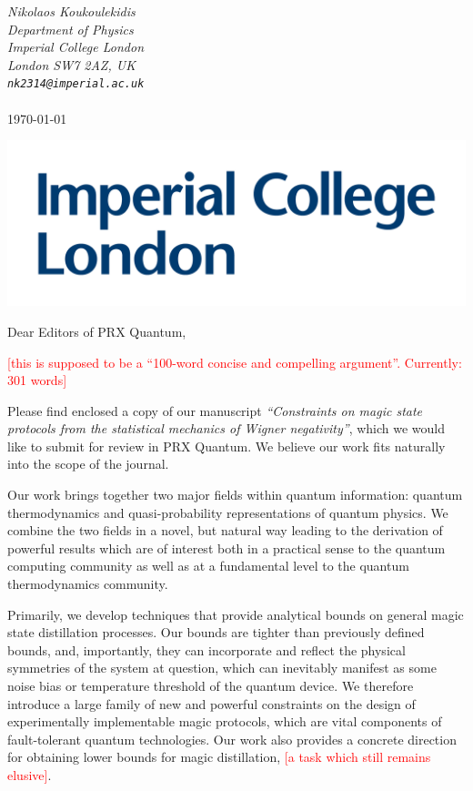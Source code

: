 \documentclass[11pt]{letter}
\newcommand{\nick}[1]{\textcolor{red}{[#1]}}
\begin{document}
\hfill\begin{minipage}{6cm}
	\raggedright
	\vspace{-2.5cm}
	{\footnotesize\itshape Nikolaos Koukoulekidis}\\
	{\footnotesize\itshape Department of Physics}\\
	{\footnotesize\itshape Imperial College London}\\
	{\footnotesize\itshape London SW7 2AZ, UK}\\
	{\footnotesize\itshape %
		\verb|nk2314@imperial.ac.uk|}\\
	~\\
		\footnotesize\today
\end{minipage}

\vspace{-3.5cm}
\includegraphics[scale=.1]{icllogo.png}
\vspace{3.5cm}

\vspace{-1.5cm}
Dear Editors of PRX Quantum,

\nick{this is supposed to be a ``100-word concise and compelling argument''. Currently: 301 words}

\vspace{.3cm}
	
Please find enclosed a copy of our manuscript \emph{``Constraints on magic state protocols from the statistical mechanics of Wigner negativity''}, which we would like to submit for review in PRX Quantum. 
We believe our work fits naturally into the scope of the journal. 

Our work brings together two major fields within quantum information: quantum thermodynamics and quasi-probability representations of quantum physics.
We combine the two fields in a novel, but natural way leading to the derivation of powerful results which are of interest both in a practical sense to the quantum computing community as well as at a fundamental level to the quantum thermodynamics community.

Primarily, we develop techniques that provide analytical bounds on general magic state distillation processes. 
Our bounds are tighter than previously defined bounds, and, importantly, they can incorporate and reflect the physical symmetries of the system at question, which can inevitably manifest as some noise bias or temperature threshold of the quantum device.
We therefore introduce a large family of new and powerful constraints on the design of experimentally implementable magic protocols, which are vital components of fault-tolerant quantum technologies.
Our work also provides a concrete direction for obtaining lower bounds for magic distillation, \nick{a task which still remains elusive}.
\end{document}

